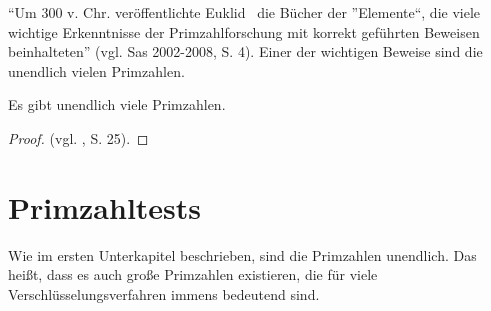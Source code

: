 \vspace{.3cm}

``Um 300 v. Chr. veröffentlichte Euklid~ die Bücher der
”Elemente“, die viele wichtige Erkenntnisse der
Primzahlforschung
mit korrekt geführten Beweisen beinhalteten'' (vgl. Sas
2002-2008, S. 4). Einer der wichtigen Beweise sind die
unendlich vielen Primzahlen.

\begin{theorem}
Es gibt unendlich viele Primzahlen.
\end{theorem}

\begin{proof}
(vgl. \cite{schichlsteinbauer}, S. 25).
\end{proof}

\newpage

\section{Primzahltests}

Wie im ersten Unterkapitel beschrieben, sind die Primzahlen
unendlich. Das heißt, dass es auch große Primzahlen
existieren, die für viele Verschlüsselungsverfahren immens
bedeutend sind.
